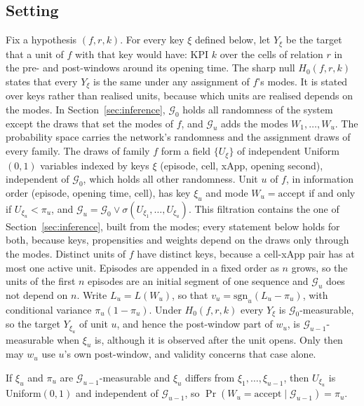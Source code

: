 \subsection{Setting}
\label{app:proof_setting}

Fix a hypothesis $(f, r, k)$. For every key $\xi$ defined below, let $Y_\xi$ be the target that a unit of $f$ with
that key would have: KPI $k$ over the cells of relation $r$ in the pre- and post-windows around its opening time. The
sharp null $H_0(f, r, k)$ states that every $Y_\xi$ is the same under any assignment of $f$'s modes. It is stated over
keys rather than realised units, because which units are realised depends on the modes. In
Section~\ref{sec:inference}, $\mathcal{G}_0$ holds all randomness of the system except the draws that set the modes of
$f$, and $\mathcal{G}_u$ adds the modes $W_1, \dots, W_u$. The probability space carries the network's randomness and the
assignment draws of every family. The draws of family $f$ form a field $\{U_\xi\}$ of
independent Uniform$(0, 1)$ variables indexed by keys $\xi$ (episode, cell, xApp, opening
second), independent of $\mathcal{G}_0$, which holds all other randomness. Unit $u$ of
$f$, in information order (episode, opening time, cell), has key $\xi_u$ and mode
$W_u = \text{accept}$ if and only if $U_{\xi_u} < \pi_u$, and
$\mathcal{G}_u = \mathcal{G}_0 \vee \sigma(U_{\xi_1}, \dots, U_{\xi_u})$. This filtration
contains the one of Section~\ref{sec:inference}, built from the modes; every statement below
holds for both, because keys, propensities and weights depend on the draws only through the
modes. Distinct units of
$f$ have distinct keys, because a cell-xApp pair has at most one active unit. Episodes are
appended in a fixed order as $n$ grows, so the units of the first $n$ episodes are an initial
segment of one sequence and $\mathcal{G}_u$ does not depend on $n$. Write
$L_u = L(W_u)$, so that
$v_u = \mathrm{sgn}_u (L_u - \pi_u)$, with conditional variance $\pi_u (1 - \pi_u)$. Under $H_0(f, r, k)$ every $Y_\xi$ is
$\mathcal{G}_0$-measurable, so the target $Y_{\xi_u}$ of unit $u$, and hence the post-window part of $w_u$, is
$\mathcal{G}_{u-1}$-measurable when $\xi_u$ is, although it is observed after the unit opens. Only then may $w_u$ use
$u$'s own post-window, and validity concerns that case alone.

\begin{lemma}
\label{lem:fresh}
If $\xi_u$ and $\pi_u$ are $\mathcal{G}_{u-1}$-measurable and $\xi_u$ differs from
$\xi_1, \dots, \xi_{u-1}$, then $U_{\xi_u}$ is Uniform$(0, 1)$ and independent of
$\mathcal{G}_{u-1}$, so $\Pr(W_u = \text{accept} \mid \mathcal{G}_{u-1}) = \pi_u$.
\end{lemma}

